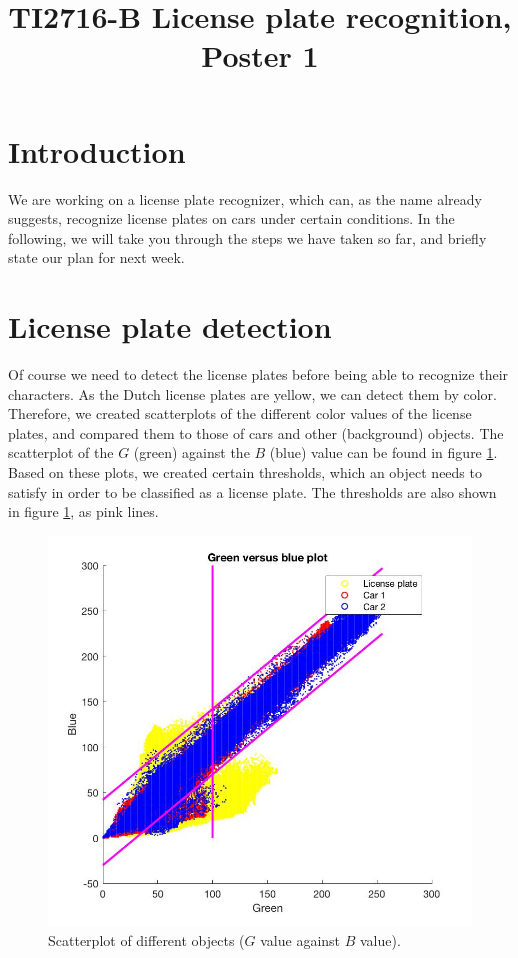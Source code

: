 \documentclass{tudelftposter}
\title{TI2716-B License plate recognition, Poster 1}
\begin{document}
\section{Introduction}
We are working on a license plate recognizer, which can, as the name already suggests, recognize license plates on cars under certain conditions. In the following, we will take you through the steps we have taken so far, and briefly state our plan for next week. 

\section{License plate detection}
Of course we need to detect the license plates before being able to recognize their characters. As the Dutch license plates are yellow, we can detect them by color. Therefore, we created scatterplots of the different color values of the license plates, and compared them to those of cars and other (background) objects. The scatterplot of the $G$ (green) against the $B$ (blue) value can be found in figure \ref{greenblue}. Based on these plots, we created certain thresholds, which an object needs to satisfy in order to be classified as a license plate. The thresholds are also shown in figure \ref{greenblue}, as pink lines. 

\begin{figure}[h]
	\centering
	\includegraphics[width=995pt]{greenblueplot.jpg}
	\caption{Scatterplot of different objects ($G$ value against $B$ value).}
	\label{greenblue}
\end{figure}
\end{document}
